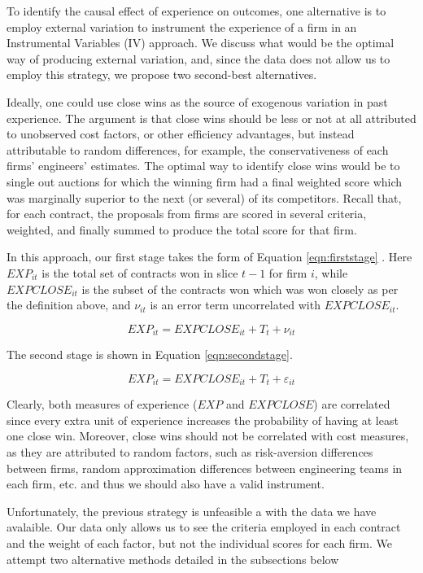 To identify the causal effect of experience on outcomes, one alternative is to employ external variation to instrument the experience of a firm in an Instrumental Variables (IV) approach. We discuss what would be the optimal way of producing external variation, and, since the data does not allow us to employ this strategy, we propose two second-best alternatives.

Ideally, one could use close wins as the source of exogenous variation in past experience. The argument is that close wins should be less or not at all attributed to unobserved cost factors, or other efficiency advantages, but instead attributable to random differences, for example, the conservativeness of each firms' engineers' estimates. The optimal way to identify close wins would be to single out auctions for which the winning firm had a final weighted score which was marginally superior to the next (or several) of its competitors.  Recall that, for each contract, the  proposals from firms are scored in several criteria, weighted, and finally summed to produce the total score for that firm.

In this approach, our first stage takes the form of Equation \ref{eqn:firststage} . Here $EXP_{it}$ is the total set of contracts won in slice $t-1$ for firm $i$, while $EXPCLOSE_{it}$ is the subset of the contracts won which was won closely as per the definition above, and $\nu_{it}$ is an error term uncorrelated with $EXPCLOSE_{it}$.

\begin{equation}
\label{eqn:firststage}
EXP_{it}= EXPCLOSE_{it}+T_t+\nu_{it}
\end{equation}

The second stage is shown in Equation \ref{eqn:secondstage}.

\begin{equation}
\label{eqn:secondstage}
EXP_{it}= EXPCLOSE_{it}+T_t+\varepsilon_{it}
\end{equation}

Clearly, both measures of experience ($EXP$ and $EXPCLOSE$) are correlated since every extra unit of experience increases the probability of having at least one close win. Moreover, close wins should not be correlated with cost measures, as they are attributed to random factors, such as risk-aversion differences between firms, random approximation differences between engineering teams in each firm, etc. and thus we should also have a valid instrument.

Unfortunately, the previous strategy is unfeasible a with the data we have avalaible. Our data only allows us to see the criteria employed in each contract and the weight of each factor, but not the individual scores for each firm. We attempt two alternative methods detailed in the subsections below

